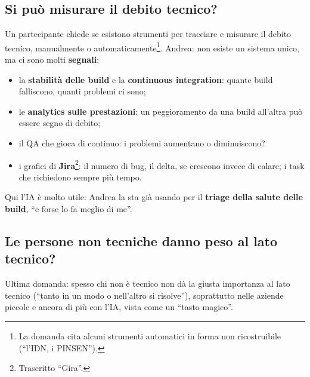 \subsection{Si può misurare il debito tecnico?}

Un partecipante chiede se esistono strumenti per tracciare e misurare il debito
tecnico, manualmente o automaticamente\footnote{La domanda cita alcuni strumenti
automatici in forma non ricostruibile (``l'IDN, i PINSEN'').}. Andrea: non esiste
un sistema unico, ma ci sono molti \textbf{segnali}:
\begin{itemize}
  \item la \textbf{stabilità delle build} e la \textbf{continuous integration}:
        quante build falliscono, quanti problemi ci sono;
  \item le \textbf{analytics sulle prestazioni}: un peggioramento da una build
        all'altra può essere segno di debito;
  \item il QA che gioca di continuo: i problemi aumentano o diminuiscono?
  \item i grafici di \textbf{Jira}\footnote{Trascritto ``Gira''.}: il numero di
        bug, il delta, se crescono invece di calare; i task che richiedono sempre
        più tempo.
\end{itemize}
Qui l'IA è molto utile: Andrea la sta già usando per il \textbf{triage della salute
delle build}, ``e forse lo fa meglio di me''.

\subsection{Le persone non tecniche danno peso al lato tecnico?}

Ultima domanda: spesso chi non è tecnico non dà la giusta importanza al lato tecnico
(``tanto in un modo o nell'altro si risolve''), soprattutto nelle aziende piccole e
ancora di più con l'IA, vista come un ``tasto magico''.

